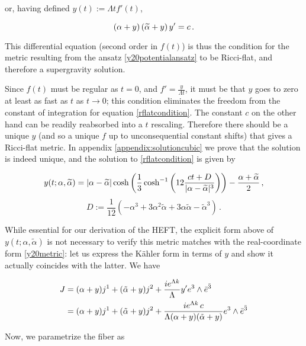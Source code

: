 or, having defined $y(t) := \Lambda t f'(t)$,

\begin{equation}
	(\alpha + y)\,(\widetilde{\alpha} + y)\, y' = c\,. \label{rflatcondition}
\end{equation}

This differential equation (second order in $f(t)$) is thus the condition for the metric resulting from the ansatz \eqref{y20potentialansatz} to be Ricci-flat, and therefore a supergravity solution.

Since $f(t)$ must be regular as $t=0$, and $f' = \frac{y}{\Lambda t}$, it must be that $y$ goes to zero at least as fast as $t$ as $t\rightarrow 0$; this condition eliminates the freedom from the constant of integration for equation \eqref{rflatcondition}. The constant $c$ on the other hand can be readily reabsorbed into a $t$ rescaling. Therefore there should be a unique $y$ (and so a unique $f$ up to unconsequential constant shifts) that gives a Ricci-flat metric. In appendix \ref{appendix:solutioncubic} we prove that the solution is indeed unique, and the solution to \eqref{rflatcondition} is given by


\begin{equation}
	y(t;\alpha,\widetilde{\alpha})  = |\alpha - \widetilde{\alpha}| \cosh \left( \frac{1}{3} \cosh^{-1} \left(  12 \frac{ct + D}{|\alpha-\widetilde{\alpha}|^3}  \right) \right)  - \frac{\alpha + \widetilde{\alpha}}{2}\,,
	\label{ysolutionmain}
\end{equation}
\begin{equation}
	 D := \frac{1}{12}(-\alpha^3 + 3 \alpha^2 \tilde\alpha + 3 \alpha\tilde{\alpha} - \tilde{\alpha}^3) \,.
	\label{}
\end{equation}

While essential for our derivation of the HEFT, the explicit form above of $y(t;\alpha,\tilde\alpha)$ is not necessary to verify this metric matches with the real-coordinate form \eqref{y20metric}: let us express the K\"ahler form in terms of $y$ and show it actually coincides with the latter. We have

\begin{align}
	\label{Jintermsofy}
	J & =  (\alpha + y) j^1 + (\tilde{\alpha} + y) j^2 + \frac{ie^{\Lambda k}}\Lambda y' e^3 \wedge \bar e^{\bar 3}\\
	  & =  (\alpha + y) j^1 + (\tilde{\alpha} + y) j^2 + \frac{ie^{\Lambda k} \,c}{\Lambda (\alpha + y)(\tilde{\alpha} + y)} e^3 \wedge \bar e^{\bar 3}
\end{align}

Now, we parametrize the fiber as 

